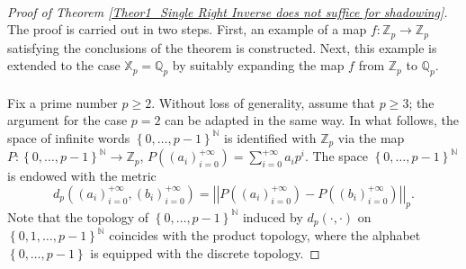 \documentclass[a4paper, 12pt]{article}
\theoremstyle{definition}
\begin{document}
	
	
	
	
	
	
	
	\paragraph{} 
	
	
	
	\begin{proof}[Proof of Theorem \ref{Theor1_Single Right Inverse does not suffice for shadowing}]
		The proof is carried out in two steps. First, an example of a map
		$f \colon \mathbb{Z}_{p} \to \mathbb{Z}_{p}$ satisfying the conclusions of the theorem is constructed.
		Next, this example is extended to the case $\mathbb{X}_{p} = \mathbb{Q}_{p}$ by suitably
		expanding the map $f$ from $\mathbb{Z}_{p}$ to $\mathbb{Q}_{p}$.
		
		
		\paragraph{}
		
		Fix a prime number $p \ge 2$. Without loss of generality, assume that $p \ge 3$; the argument for the case $p=2$ can be adapted in the same way. 
		In what follows, the space of infinite words $ \left\{  0, \dots, p-1  \right\} ^{\mathbb{N} }$ is identified with $\mathbb{Z}_{p}$ via the map $P:  \left\{  0, \dots, p-1  \right\} ^{\mathbb{N} } \to \mathbb{Z}_{p}$, $P \left(   \left(  a_{i}   \right)_{i=0}^{+ \infty }  \right)  = \sum_{i=0}^{+ \infty } a_{i} p^{i}$. The space $ \left\{  0, \dots, p-1  \right\} ^{\mathbb{N} }$ is endowed with the metric 
		$$d_{p} \left(   \left(  a_{i}   \right)_{i=0}^{+ \infty },  \left(  b_{i}   \right)_{i=0}^{+ \infty }  \right)    =     \left| \left|  P \left(   \left(  a_{i}   \right)_{i=0}^{+ \infty }  \right)  - P \left(   \left(  b_{i}   \right)_{i=0}^{+ \infty }  \right)   \right|  \right|_{p} . $$
		Note that the topology of $ \left\{  0, \dots, p-1  \right\} ^{\mathbb{N} }$ induced by $d_{p} \left(  \cdot, \cdot  \right) $ on $ \left\{  0, 1, \dots, p-1  \right\} ^{\mathbb{N} }$ coincides with the product topology, where the alphabet $ \left\{  0, \dots, p-1  \right\} $ is equipped with the discrete topology. 
		

\end{proof}
\end{document}
